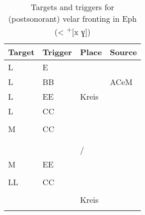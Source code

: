 \begin{table}
\caption{Targets and triggers for (postsonorant) velar fronting in Eph (< \textsuperscript{+}[x ɣ])\label{tab:12.17}}
\begin{tabularx}{\textwidth}{llQQ}
\lsptoprule
Target & Trigger & Place & Source\\\midrule
L & E &   & \citet{Löfstedt1933}\\
L & BB &   &  {ACeM}\\
L & EE & Kreis  & \citet{BethgeBonnin1969}\\
L & CC &   &\citet{Bierwirth1890}\\
  &     &   &                     \citet{Heibey1891}\\
M & CC &                   &     \citet{Block1910}   \\
  &    &                    &     \citet{Dahlberg1937}\\
  &    &                &     \citet{Brugge1944}  \\
  &    &  / &     \citet{Lange1963}\\
M & EE &      & \citet{Roloff1902}\\
  &      &      & \citet{Hille1939}\\
LL & CC &           & \citet{Pahl1943}           \\
   &    &              & \citet{BethgeFlechsig1958} \\
   &    &Kreis     & \citet{BethgeBonnin1969}\\
\lspbottomrule
\end{tabularx}
\end{table}

